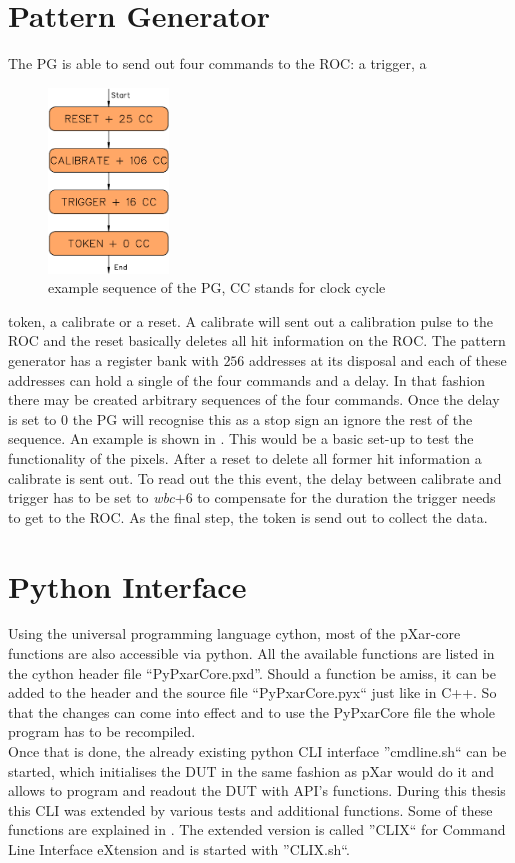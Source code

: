 \documentclass[british,11pt,a4paper]{memoir}
\begin{document}
\section{Pattern Generator}
The \ac{PG} is able to send out four commands to the \ac{ROC}: a trigger, a  
\begin{figure}
	\includegraphics[width=3.2cm]{PG}
	\caption{example sequence of the \ac{PG}, CC stands for clock cycle}
	\label{p14}
\end{figure} 
token, a calibrate or a reset. A calibrate will sent out a calibration pulse to the \ac{ROC} and the reset basically deletes all hit information on the \ac{ROC}. The pattern generator has a register bank with $256$ addresses at its disposal and each of these addresses can hold a single of the four commands and a delay. In that fashion there may be created arbitrary sequences of the four commands. Once the delay is set to $0$ the \ac{PG} will recognise this as a stop sign an ignore the rest of the sequence. An example is shown in . This would be a basic set-up to test the functionality of the pixels. After a reset to delete all former hit information a calibrate is sent out. To read out the this event, the delay between calibrate and trigger has to be set to \textit{wbc}$+6$ to compensate for the duration the trigger needs to get to the \ac{ROC}. As the final step, the token is send out to collect the data.
\section{Python Interface}
Using the universal programming language cython, most of the pXar-core functions are also accessible via python. All the available functions are listed in the cython header file ``PyPxarCore.pxd''. Should a function be amiss, it can be added to the header and the source file ``PyPxarCore.pyx`` just like in C++. So that the changes can come into effect and to use the PyPxarCore file the whole program has to be recompiled.\\
Once that is done, the already existing python \ac{CLI} interface ''cmdline.sh`` can be started, which initialises the \ac{DUT} in the same fashion as pXar would do it and allows to program and readout the \ac{DUT} with \ac{API}'s functions. During this thesis this \ac{CLI} was extended by various tests and additional functions. Some of these functions are explained in . The extended version is called ''CLIX`` for Command Line Interface eXtension and is started with ''CLIX.sh``.
\end{document}

